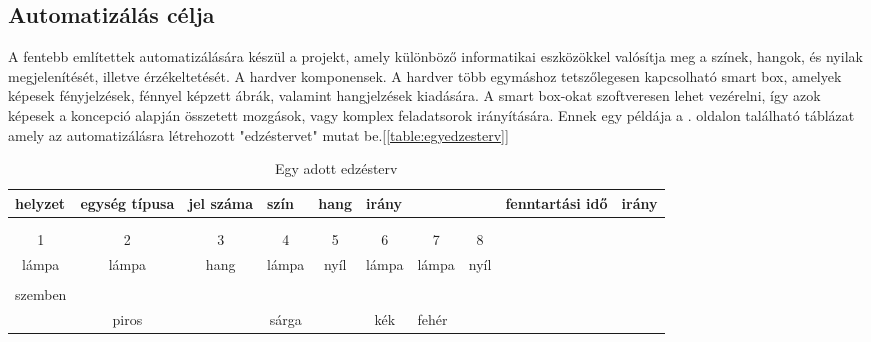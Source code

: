 \documentclass[tocnopagenum]{thesis-ekf}
\theoremstyle{definition}
\theoremstyle{remark}
\begin{document}
	\subsection*{Automatizálás célja}
	A fentebb említettek automatizálására készül a projekt, amely különböző informatikai eszközökkel valósítja meg a színek, hangok, és nyilak megjelenítését, illetve érzékeltetését. 
	A hardver komponensek. A hardver több egymáshoz tetszőlegesen kapcsolható smart box, amelyek képesek fényjelzések, fénnyel képzett ábrák, valamint hangjelzések kiadására. A smart box-okat szoftveresen lehet vezérelni, így azok képesek a koncepció alapján összetett mozgások, vagy komplex feladatsorok irányítására.
	Ennek egy példája a \pageref{table:egyedzesterv}. oldalon található táblázat amely az automatizálásra létrehozott "edzéstervet" mutat be.[\ref{table:egyedzesterv}]
	\begin{table}[h]
		\centering
		\caption{Egy adott edzésterv}
		\scalebox{0.7}
		{
			\begin{tabular}{|rrrrlrrrrr|}
				\hline
				\multicolumn{1}{|l|}{\textbf{helyzet}} & \multicolumn{1}{l|}{\textbf{egység típusa}} & \multicolumn{1}{l|}{\textbf{jel száma}} & \multicolumn{1}{l|}{\textbf{szín}} & \multicolumn{1}{l|}{\textbf{hang}} & \multicolumn{1}{l|}{\textbf{irány}} &       &       & \multicolumn{1}{l}{\textbf{fenntartási idő}} & \multicolumn{1}{l|}{\textbf{irány}} \bigstrut\\
				\hline
				&       &       &       &       &       &       &       &       &  \bigstrut[t]\\
				&       &       &       &       &       &       &       &       &  \\
				\multicolumn{1}{|c}{1} & \multicolumn{1}{c}{2} & \multicolumn{1}{c}{3} & \multicolumn{1}{c}{4} & \multicolumn{1}{c}{5} & \multicolumn{1}{c}{6} & \multicolumn{1}{c}{7} & \multicolumn{1}{c}{8} &       &  \\
				\multicolumn{1}{|c}{lámpa} & \multicolumn{1}{c}{lámpa} & \multicolumn{1}{c}{hang} & \multicolumn{1}{c}{lámpa} & \multicolumn{1}{c}{nyíl} & \multicolumn{1}{c}{lámpa} & \multicolumn{1}{c}{lámpa} & \multicolumn{1}{c}{nyíl} &       &  \\
				&       &       &       &       &       &       &       &       &  \\
				\multicolumn{1}{|l}{szemben} &       &       &       &       &       &       &       &       &  \bigstrut[b]\\
				\cline{1-2}\cline{7-7}    \rowcolor[rgb]{ .6,  .8,  0} \multicolumn{1}{|c|}{\textcolor[rgb]{ .2,  .6,  .4}{zöld}} & \multicolumn{1}{c|}{\cellcolor[rgb]{ 1,  0,  0}piros} & \cellcolor[rgb]{ 1,  1,  1} & \multicolumn{1}{c}{\cellcolor[rgb]{ 1,  1,  0}sárga} & \cellcolor[rgb]{ 1,  1,  1} & \multicolumn{1}{c|}{\cellcolor[rgb]{ .2,  .4,  1}kék} & \multicolumn{1}{l|}{\cellcolor[rgb]{ 1,  1,  1}fehér} & \cellcolor[rgb]{ 1,  1,  1} & \cellcolor[rgb]{ 1,  1,  1} & \cellcolor[rgb]{ 1,  1,  1} \bigstrut\\

\end{tabular}}
\end{table}
\end{document}
